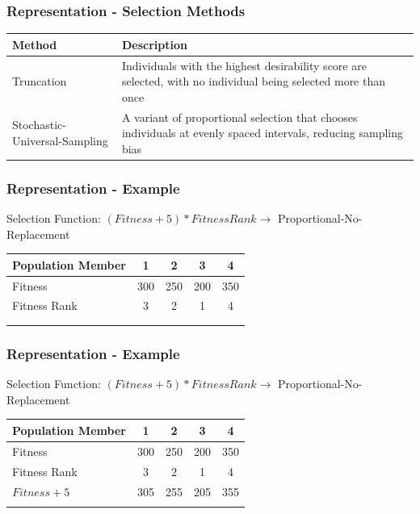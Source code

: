 \documentclass{beamer}
\begin{document}
	
	\begin{frame}
		\frametitle{Representation - Selection Methods}
		
		\begin{table}
		\centering
		  \label{tab:selection-methods2}
		  \begin{tabular}{p{3cm}|p{7cm}}
		    \textbf{Method} & \textbf{Description}\\
			    \hline
				Truncation & Individuals with the highest desirability score are selected, with no individual being selected more than once \\
				\hline
				Stochastic-Universal-Sampling & A variant of proportional selection that chooses individuals at evenly spaced intervals, reducing sampling bias\\	
				\hline	    
		\end{tabular}
		\end{table}		
	\end{frame}		
	
	\begin{frame}
		\frametitle{Representation - Example}
		Selection Function: $(Fitness + 5) * FitnessRank \rightarrow$ Proportional-No-Replacement
		\begin{table}
			\begin{tabular}{ m{5cm} | c | c | c | c }
				Population Member & 1 & 2 & 3 & 4  \\
				\hline
				Fitness & 300 & 250 & 200 & 350  \\
				Fitness Rank & 3 & 2 & 1 & 4 \\
				& & & & \\ 
				& & & & \\
			\end{tabular}
		\end{table}		
	\end{frame}	
	
	\begin{frame}
		\frametitle{Representation - Example}
		Selection Function: $(Fitness + 5) * FitnessRank \rightarrow$ Proportional-No-Replacement
		\begin{table}
			\begin{tabular}{ m{5cm} | c | c | c | c }
				Population Member & 1 & 2 & 3 & 4  \\
				\hline
				Fitness & 300 & 250 & 200 & 350  \\
				Fitness Rank & 3 & 2 & 1 & 4 \\
				\hline
				$Fitness + 5$ & 305 & 255 & 205 & 355 \\ 
				& & & & \\ 
			\end{tabular}
		\end{table}		
	\end{frame} 
	
\end{document}
